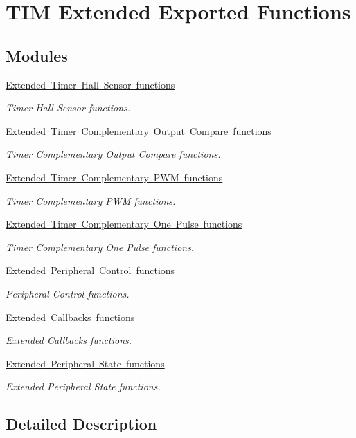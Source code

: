 \hypertarget{group___t_i_m_ex___exported___functions}{}\section{T\+IM Extended Exported Functions}
\label{group___t_i_m_ex___exported___functions}
\subsection*{Modules}
\begin{DoxyCompactItemize}
\item 
\mbox{\hyperlink{group___t_i_m_ex___exported___functions___group1}{Extended Timer Hall Sensor functions}}
\begin{DoxyCompactList}\small\item\em Timer Hall Sensor functions. \end{DoxyCompactList}\item 
\mbox{\hyperlink{group___t_i_m_ex___exported___functions___group2}{Extended Timer Complementary Output Compare functions}}
\begin{DoxyCompactList}\small\item\em Timer Complementary Output Compare functions. \end{DoxyCompactList}\item 
\mbox{\hyperlink{group___t_i_m_ex___exported___functions___group3}{Extended Timer Complementary P\+W\+M functions}}
\begin{DoxyCompactList}\small\item\em Timer Complementary P\+WM functions. \end{DoxyCompactList}\item 
\mbox{\hyperlink{group___t_i_m_ex___exported___functions___group4}{Extended Timer Complementary One Pulse functions}}
\begin{DoxyCompactList}\small\item\em Timer Complementary One Pulse functions. \end{DoxyCompactList}\item 
\mbox{\hyperlink{group___t_i_m_ex___exported___functions___group5}{Extended Peripheral Control functions}}
\begin{DoxyCompactList}\small\item\em Peripheral Control functions. \end{DoxyCompactList}\item 
\mbox{\hyperlink{group___t_i_m_ex___exported___functions___group6}{Extended Callbacks functions}}
\begin{DoxyCompactList}\small\item\em Extended Callbacks functions. \end{DoxyCompactList}\item 
\mbox{\hyperlink{group___t_i_m_ex___exported___functions___group7}{Extended Peripheral State functions}}
\begin{DoxyCompactList}\small\item\em Extended Peripheral State functions. \end{DoxyCompactList}\end{DoxyCompactItemize}


\subsection{Detailed Description}
